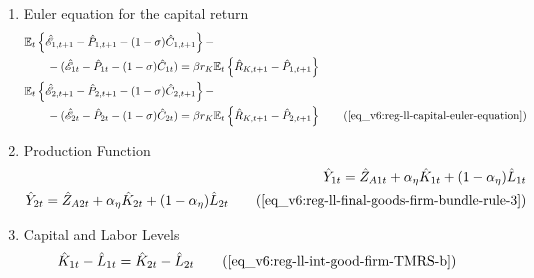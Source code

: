 \documentclass[../thesis.tex]{subfiles}
\begin{document}
{\begin{enumerate}
		\item Euler equation for the capital return
		\begin{alignat}{2}
			&\E \left\{ \hat{\mathscr{E}}_{1, t+1} - \hat{P}_{1, t+1}  - (1 -\sigma) \hat{C}_{1, t+1} \right\} - \nonumber \\ &\qquad - (\hat{\mathscr{E}}_{1 t} - \hat{P}_{1 t} - (1 -\sigma) \hat{C}_{1 t}) = \beta r_{K} \mathbb{E}_t \left\{ \hat{R}_{K, t+1} - \hat{P}_{1, t+1} \right\} \nonumber \\
			&\E \left\{ \hat{\mathscr{E}}_{2, t+1} - \hat{P}_{2, t+1}  - (1 -\sigma) \hat{C}_{2, t+1} \right\} - \nonumber \\ &\qquad - (\hat{\mathscr{E}}_{2 t} - \hat{P}_{2 t} - (1 -\sigma) \hat{C}_{2 t}) = \beta r_{K} \mathbb{E}_t \left\{ \hat{R}_{K, t+1} - \hat{P}_{2, t+1} \right\} \tag{\ref{eq_v6:reg-ll-capital-euler-equation}}
		\end{alignat}
		
		\item Production Function
		\begin{align}
			\hat{Y}_{1 t} = \hat{Z}_{A1 t} + {\alpha_{\eta}} \hat{K}_{1 t} + (1-\alpha_{\eta}) \hat{L}_{1 t} \nonumber \\
			\hat{Y}_{2 t} = \hat{Z}_{A2 t} + {\alpha_{\eta}} \hat{K}_{2 t} + (1-\alpha_{\eta}) \hat{L}_{2 t} \tag{\ref{eq_v6:reg-ll-final-goods-firm-bundle-rule-3}}
		\end{align}

		\item Capital and Labor Levels 
		\begin{align}
			\hat{K}_{1t} - \hat{L}_{1t} &= \hat{K}_{2t} - \hat{L}_{2t} \tag{\ref{eq_v6:reg-ll-int-good-firm-TMRS-b}}
		\end{align}


\begin{comment}
	
		\item Marginal Rates of Substitution of Factors
\begin{align}
	\hat{K}_{1 t} - \hat{L}_{1 t} = \hat{W}_{t} - \hat{R}_{K t} \nonumber \\
	\hat{K}_{2 t} - \hat{L}_{2 t} = \hat{W}_{t} - \hat{R}_{K t} \tag{\ref{eq_v6:reg-ll-int-good-firm-TMRS}}
\end{align}	
	
\end{comment}
		


\end{enumerate}}
\end{document}
